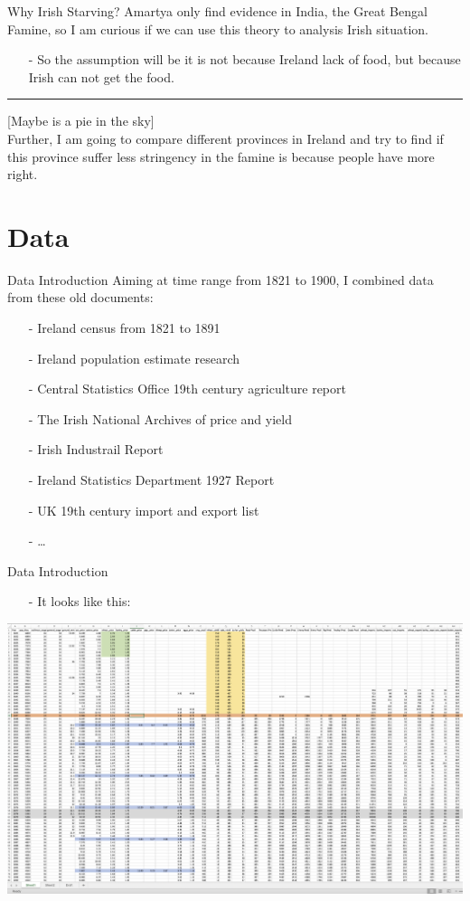\documentclass{beamer}[12pt]
\begin{document}
\begin{frame}{Why Irish Starving?}
	Amartya only find evidence in India, the Great Bengal Famine, so I am curious if we can use this theory to analysis Irish situation.
	\begin{itemize}
		\item[-] So the assumption will be it is not because Ireland lack of food, but because Irish can not get the food.
	\end{itemize}
	\rule{\linewidth}{0.3mm}
	[Maybe is a pie in the sky]\\
	\vspace*{.5cm}
	Further, I am going to compare different provinces in Ireland and try to find if this province suffer less stringency in the famine is because people have more right.
\end{frame}

\section{Data}
\begin{frame}{Data Introduction}
	Aiming at time range from 1821 to 1900, I combined data from these old documents:
	\begin{itemize}
		\item[-] Ireland census from 1821 to 1891
		\item[-] Ireland population estimate research
		\item[-] Central Statistics Office 19th century agriculture report
		\item[-] The Irish National Archives of price and yield
		\item[-] Irish Industrail Report 
		\item[-] Ireland Statistics Department 1927 Report
		\item[-] UK 19th century import and export list
		\item[-] \ldots
	\end{itemize}
\end{frame}

\begin{frame}{Data Introduction}
	\begin{itemize}
		\item[-] It looks like this:
	\end{itemize}
	\includegraphics[width=1.05\textwidth]{dataframe_look.png}
\end{frame}
\end{document}
